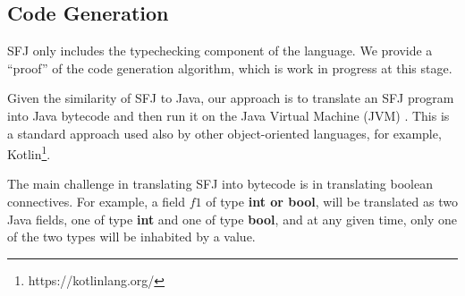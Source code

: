 \documentclass[runningheads]{llncs}
\begin{document}

\subsection{Code Generation}
\label{sec:code_generation}
SFJ only includes the typechecking component of the language. We provide a ``proof'' of the code generation algorithm, which is work in progress at this stage.

Given the similarity of SFJ to Java, our approach is to translate an SFJ program into Java bytecode and then run it on the Java Virtual Machine (JVM) \cite{lindholm2013}. This is a standard approach used also by other object-oriented languages, for example, Kotlin\footnote{https://kotlinlang.org/}. 

The main challenge in translating SFJ into bytecode is in translating boolean connectives.
For example, a field $f1$ of type \textbf{int or bool}, will be translated as two Java fields, one of type \textbf{int} and one of type \textbf{bool}, and at any given time, only one of the two types will be inhabited by a value. 
\end{document}
